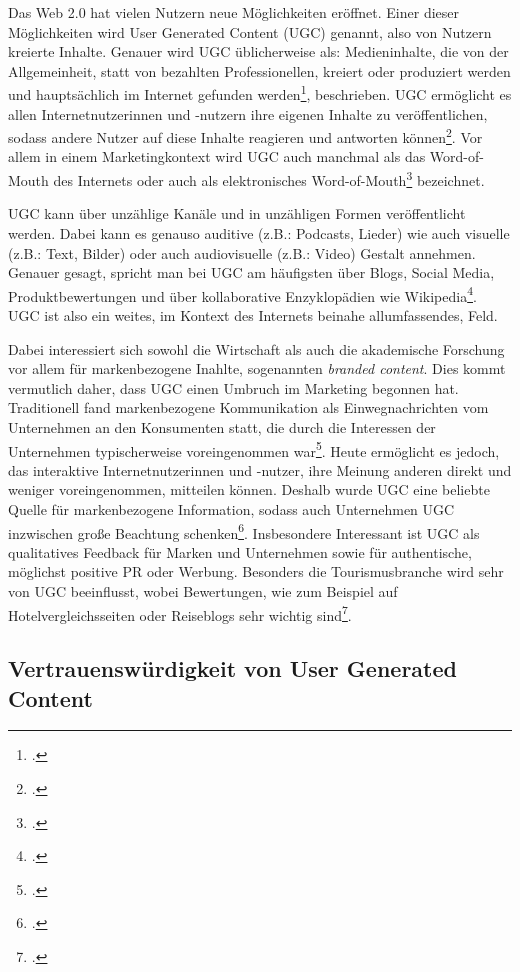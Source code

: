 Das Web 2.0 hat vielen Nutzern neue Möglichkeiten eröffnet. Einer dieser Möglichkeiten wird User Generated Content (UGC) genannt, also von Nutzern kreierte Inhalte. Genauer wird UGC üblicherweise als: Medieninhalte, die von der Allgemeinheit, statt von bezahlten Professionellen, kreiert oder produziert werden und hauptsächlich im Internet gefunden werden\footcite{terry}, beschrieben. UGC ermöglicht es allen Internetnutzerinnen und -nutzern ihre eigenen Inhalte zu veröffentlichen, sodass andere Nutzer auf diese Inhalte reagieren und antworten können\footcite{cox}. Vor allem in einem Marketingkontext wird UGC auch manchmal als das Word-of-Mouth des Internets oder auch als elektronisches Word-of-Mouth\footcite{morrison} bezeichnet.

UGC kann über unzählige Kanäle und in unzähligen Formen veröffentlicht werden. Dabei kann es genauso auditive (z.B.: Podcasts, Lieder) wie auch visuelle (z.B.: Text, Bilder) oder auch audiovisuelle (z.B.: Video) Gestalt annehmen. Genauer gesagt, spricht man bei UGC am häufigsten über Blogs, Social Media, Produktbewertungen und über kollaborative Enzyklopädien wie Wikipedia\footcite{chen}. UGC ist also ein weites, im Kontext des Internets beinahe allumfassendes, Feld.

Dabei interessiert sich sowohl die Wirtschaft als auch die akademische Forschung vor allem für markenbezogene Inahlte, sogenannten \textit{branded content}. Dies kommt vermutlich daher, dass UGC einen Umbruch im Marketing begonnen hat. Traditionell fand markenbezogene Kommunikation als Einwegnachrichten vom Unternehmen an den Konsumenten statt, die durch die Interessen der Unternehmen typischerweise voreingenommen war\footcite{ramirez}. Heute ermöglicht es jedoch, das interaktive Internetnutzerinnen und -nutzer, ihre Meinung anderen direkt und weniger voreingenommen, mitteilen können. Deshalb wurde UGC eine beliebte Quelle für markenbezogene Information, sodass auch Unternehmen UGC inzwischen große Beachtung schenken\footcite{ramirez}. Insbesondere Interessant ist UGC als qualitatives Feedback für Marken und Unternehmen sowie für authentische, möglichst positive PR oder Werbung. Besonders die Tourismusbranche wird sehr von UGC beeinflusst, wobei Bewertungen, wie zum Beispiel auf Hotelvergleichsseiten oder Reiseblogs sehr wichtig sind\footcite{akehurst}.

\subsection{Vertrauenswürdigkeit von User Generated Content}

